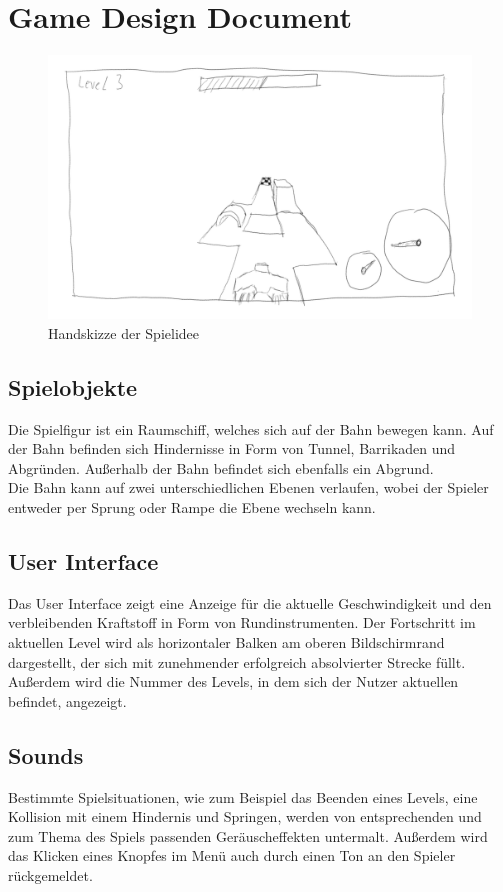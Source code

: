 \section{Game Design Document}
\begin{figure}[ht]
\centering
\includegraphics[width=.8\textwidth]{gfx/mockup.png}
\caption{Handskizze der Spielidee}
\end{figure}
\subsection{Spielobjekte}
Die Spielfigur ist ein Raumschiff, welches sich auf der Bahn bewegen kann. Auf der Bahn befinden sich Hindernisse in Form von Tunnel, Barrikaden und Abgründen. Außerhalb der Bahn befindet sich ebenfalls ein Abgrund.\\
Die Bahn kann auf zwei unterschiedlichen Ebenen verlaufen, wobei der Spieler entweder per Sprung oder Rampe die Ebene wechseln kann.

\subsection{User Interface}
Das User Interface zeigt eine Anzeige für die aktuelle Geschwindigkeit und den verbleibenden Kraftstoff in Form von Rundinstrumenten. Der Fortschritt im aktuellen Level wird als horizontaler Balken am oberen Bildschirmrand dargestellt, der sich mit zunehmender erfolgreich absolvierter Strecke füllt. Außerdem wird die Nummer des Levels, in dem sich der Nutzer aktuellen befindet, angezeigt.

\subsection{Sounds}
Bestimmte Spielsituationen, wie zum Beispiel das Beenden eines Levels, eine Kollision mit einem Hindernis und Springen, werden von entsprechenden und zum Thema des Spiels passenden Geräuscheffekten untermalt. Außerdem wird das Klicken eines Knopfes im Menü auch durch einen Ton an den Spieler rückgemeldet.

